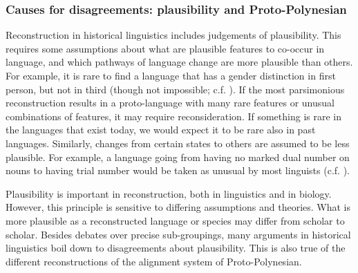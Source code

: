 \documentclass[a4paper,10pt]{article} %
\begin{document}


\subsubsection{Causes for disagreements: plausibility and Proto-Polynesian}
Reconstruction in historical linguistics includes judgements of plausibility. This requires some assumptions about what are plausible features to co-occur in language, and which pathways of language change are more plausible than others. For example, it is rare to find a language that has a gender distinction in first person, but not in third (though not impossible; c.f. \citet{wals-44}). If the most parsimonious reconstruction results in a proto-language with many rare features or unusual combinations of features, it may require reconsideration. If something is rare in the languages that exist today, we would expect it to be rare also in past languages. Similarly, changes from certain states to others are assumed to be less plausible. For example, a language going from having no marked dual number on nouns to having trial number would be taken as unusual by most linguists (c.f. \citet[8]{kikusawa_2006_pro_number}). 

Plausibility is important in reconstruction, both in linguistics and in biology. However, this principle is sensitive to differing assumptions and theories. What is more plausible as a reconstructed language or species may differ from scholar to scholar. Besides debates over precise sub-groupings, many arguments in historical linguistics boil down to disagreements about plausibility. This is also true of the different reconstructions of the alignment system of Proto-Polynesian.
\end{document}
